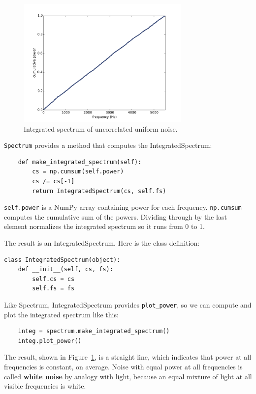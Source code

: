 \documentclass[12pt]{book}
\begin{document}
\begin{figure}
\centerline{\includegraphics[height=2.5in]{figs/whitenoise2.pdf}}
\caption{Integrated spectrum of uncorrelated uniform noise.}
\label{fig.whitenoise2}
\end{figure}

{\tt Spectrum} provides a method that computes the IntegratedSpectrum:

\begin{verbatim}
    def make_integrated_spectrum(self):
        cs = np.cumsum(self.power)
        cs /= cs[-1]
        return IntegratedSpectrum(cs, self.fs)
\end{verbatim}

{\tt self.power} is a NumPy array containing power for each frequency.
{\tt np.cumsum} computes the cumulative sum of the powers.
Dividing through by the last element normalizes the integrated
spectrum so it runs from 0 to 1.

The result is an IntegratedSpectrum.  Here is the class definition:

\begin{verbatim}
class IntegratedSpectrum(object):    
    def __init__(self, cs, fs):
        self.cs = cs
        self.fs = fs
\end{verbatim}

Like Spectrum, IntegratedSpectrum provides \verb"plot_power", so
we can compute and plot the integrated spectrum like this:

\begin{verbatim}
    integ = spectrum.make_integrated_spectrum()
    integ.plot_power()
\end{verbatim}

The result, shown in Figure~\ref{fig.whitenoise2}, is a straight line,
which indicates that power at all frequencies is constant, on average.
Noise with equal power at all frequencies is called {\bf white noise}
by analogy with light, because an equal mixture of light at all
visible frequencies is white.
\end{document}
